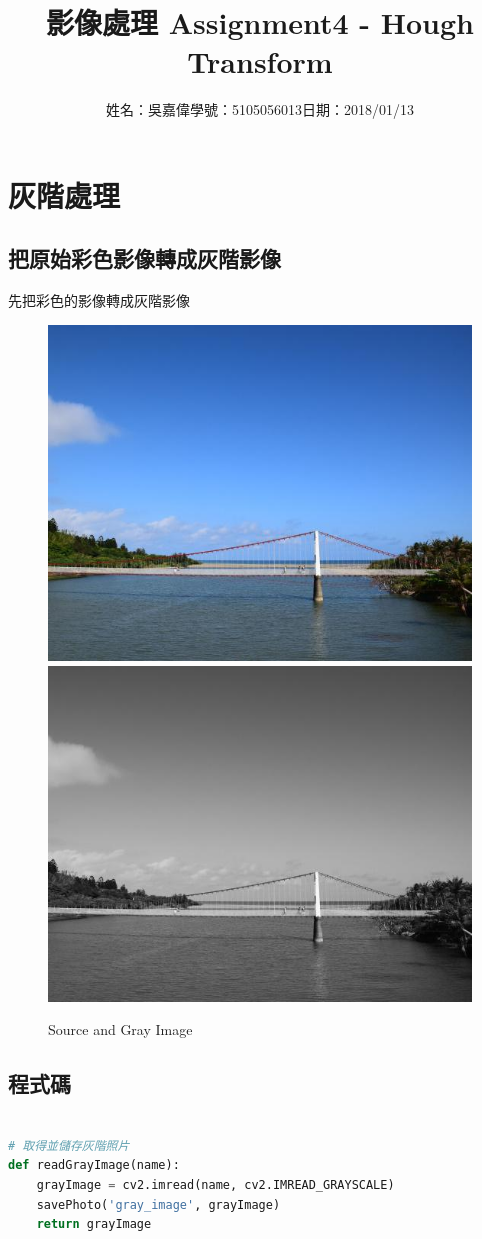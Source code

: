 \documentclass[12pt,a4paper]{article}
\title{\huge 影像處理 Assignment4 - Hough Transform} %
\author{姓名：吳嘉偉\quad 學號：5105056013\quad 日期：2018/01/13} %
\date{} %
\begin{document}
\clearpage

\maketitle %

\section{灰階處理}

\subsection{把原始彩色影像轉成灰階影像}

{
\fontsize{14pt}{10pt} %
\selectfont %
先把彩色的影像轉成灰階影像
\begin{figure}[ht]
\centering
\includegraphics[width=.4\textwidth]{image/bridge.jpg}
\hspace{1cm}
\includegraphics[width=.4\textwidth]{image/gray_image.png}
\caption{Source and Gray Image}%
\label{要合併的兩張圖}%
\end{figure}
}

\newpage %
\subsection{程式碼}

{
\begin{lstlisting}[language=Python]

# 取得並儲存灰階照片
def readGrayImage(name):
    grayImage = cv2.imread(name, cv2.IMREAD_GRAYSCALE)
    savePhoto('gray_image', grayImage)
    return grayImage
    
\end{lstlisting}
}
\end{document}
